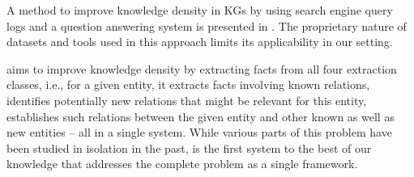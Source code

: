 A method to improve knowledge density in KGs by using search engine query logs and a question answering system is presented in \cite{west2014knowledge}. The proprietary nature of datasets and tools used in this approach limits its applicability in our setting.

\system{} aims to improve knowledge density by extracting facts from all four extraction classes, i.e., for a given entity, it extracts facts involving known relations, identifies potentially new relations that might be relevant for this entity, establishes such relations between the given entity and other known as well as new entities -- all in a single system. While various parts of this problem have been studied in isolation in the past, \system{} is the first system to the best of our knowledge that addresses the complete problem as a single framework.



%

